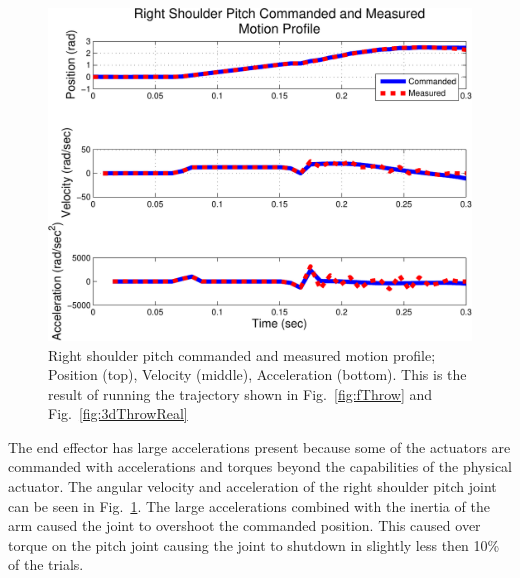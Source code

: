 \begin{figure}[thpb]
  \centering
\includegraphics[width=1.0\columnwidth]{./MATLAB/throwTrajRSPplot.pdf}
  \caption{Right shoulder pitch commanded and measured motion profile; Position (top), Velocity (middle), Acceleration (bottom).  This is the result of running the trajectory shown in Fig.~\ref{fig:fThrow} and Fig.~\ref{fig:3dThrowReal}}
  \label{fig:velosPlot}
\end{figure}


The end effector has large accelerations present because some of the actuators are commanded with accelerations and torques beyond the capabilities of the physical actuator.  The angular velocity and acceleration of the right shoulder pitch joint can be seen in Fig.~\ref{fig:velosPlot}.  The large accelerations combined with the inertia of the arm caused the joint to overshoot the commanded position.  This caused over torque on the pitch joint causing the joint to shutdown in slightly less then 10\% of the trials.




